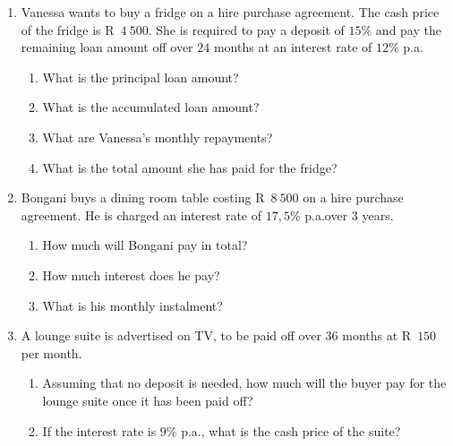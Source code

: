 \begin{exercises}{}{
    \begin{enumerate}[label=\textbf{\arabic*}.]
	\item Vanessa wants to buy a fridge on a hire purchase agreement. The cash price of the fridge is R~$4~500$. She is required to pay a deposit of $15\%$ and pay the remaining loan amount off over $24$ months at an interest rate of $12\%$ p.a.
	\begin{enumerate}[noitemsep, label=\textbf{(\alph*)} ]
	    \item What is the principal loan amount?
	    \item What is the accumulated loan amount?
	    \item What are Vanessa's monthly repayments?
	    \item What is the total amount she has paid for the fridge?
	\end{enumerate}
	\item Bongani buys a dining room table costing R~$8~500$ on a
          hire purchase agreement. He is charged an interest rate of
          $17,5\%$ p.a.\@ over $3$ years.
	\begin{enumerate}[noitemsep, label=\textbf{(\alph*)} ]
	    \item How much will Bongani pay in total?
	    \item How much interest does he pay?
	    \item What is his monthly instalment?
	\end{enumerate}
	\item A lounge suite is advertised on TV, to be paid off over $36$ months at R~$150$ per month.
	\begin{enumerate}[noitemsep, label=\textbf{(\alph*)} ]
	    \item Assuming that no deposit is needed, how much will the buyer pay for the lounge suite once it has been paid off?
	    \item If the interest rate is $9\%$ p.a., what is the cash price of the suite?\\
	\end{enumerate}
    \end{enumerate}
}
\end{exercises}


